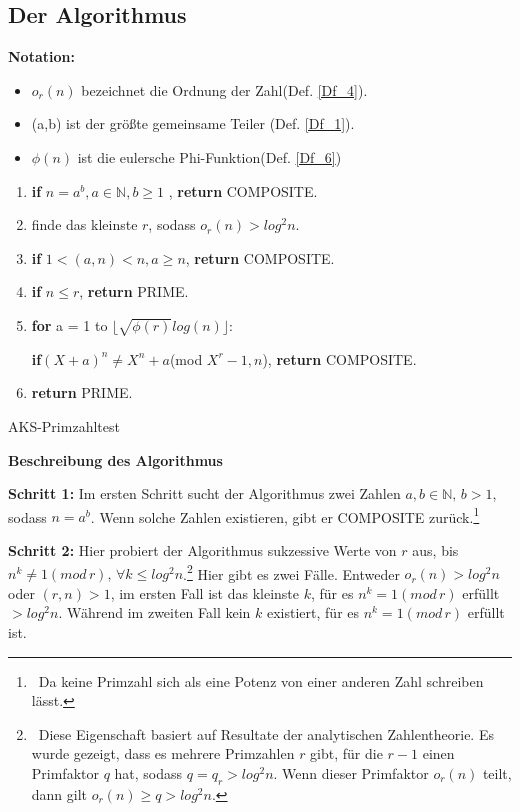 \documentclass[12pt,oneside]{article}
\theoremstyle{remark}
\theoremstyle{definition}
\begin{document}
\subsection{Der Algorithmus}\label{algo}
\textbf{Notation:}
\begin{itemize}
    \item $o_r(n)$ bezeichnet die Ordnung der
Zahl(Def. \ref{Df_4}).
    \item (a,b) ist der größte gemeinsame Teiler (Def. \ref{Df_1}).
\item $\phi(n)$ ist die eulersche Phi-Funktion(Def. \ref{Df_6})  
\end{itemize}
\begin{algorithm}[H]
\SetAlgoLined
{}

\begin{enumerate}
\item \textbf{if} $n = a^b, a \in \mathbb{N}, b \geq 1$ , \textbf{return} COMPOSITE.
\item  finde das kleinste $r$, sodass $o_{r}(n) > log^2 n $.
\item \textbf{if} $1 < (a,n) < n, a \geq n $, \textbf{return} COMPOSITE.
\item \textbf{if} $n \leq r $, \textbf{return} PRIME.
\item \textbf{for} a = 1 to $\lfloor \sqrt{\phi(r)}log(n) \rfloor$:

 \textbf{if}$(X + a)^n \neq X^n + a $(mod $X^r - 1, n$), \textbf{return} COMPOSITE.
 \item \textbf{return} PRIME.
\end{enumerate}
 
\caption{AKS-Primzahltest}
\end{algorithm}

\textbf{Beschreibung des Algorithmus}\newline

\textbf{Schritt 1: }Im ersten Schritt sucht der Algorithmus zwei Zahlen $a,b \in \mathbb{N}, \, b > 1$, sodass $n = a^b$. Wenn solche Zahlen existieren, gibt er COMPOSITE zurück.\footnote{$\,$ Da keine Primzahl sich als eine Potenz von einer anderen Zahl schreiben lässt.}  

\textbf{Schritt 2: }Hier probiert der Algorithmus sukzessive Werte von $r$ aus, bis $n^k \neq 1 (mod \, r), \, \forall k \leq log^2 n$.\footnote{$\,$ Diese Eigenschaft basiert auf Resultate  der analytischen Zahlentheorie. Es wurde gezeigt, dass es mehrere Primzahlen $r$ gibt, für die $r - 1$ einen Primfaktor $q$ hat, sodass $q = q_r > log^2n$. Wenn dieser Primfaktor $o_r(n)$ teilt, dann gilt $o_r(n) \geq q  > log^2 n$\cite{and-gar}.} Hier gibt es zwei Fälle. Entweder $o_r(n) > log^2 n$ oder $(r,n) > 1$, im ersten Fall ist das kleinste $k$, für es $n^k =  1 (mod \, r)$ erfüllt $ > log^2n$. Während im zweiten Fall kein $k$ existiert, für es $n^k = 1 (mod \, r)$ erfüllt ist.  
\end{document}
